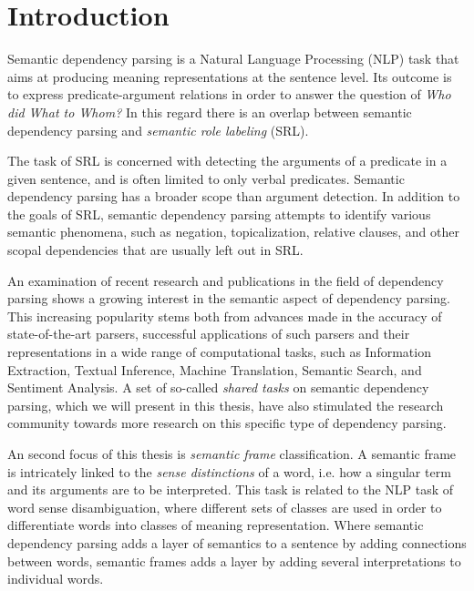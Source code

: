 \chapter{Introduction}
\label{chap:introduction}


Semantic dependency parsing is a Natural Language Processing (NLP) task that aims at producing meaning representations at the sentence level. Its outcome is to express predicate-argument relations in order to answer the question of \textit{Who did What to Whom?} In this regard there is an overlap between semantic dependency parsing and \textit{semantic role labeling} (SRL). 

The task of SRL is concerned with detecting the arguments of a predicate in a given sentence, and is often limited to only verbal predicates. Semantic dependency parsing has a broader scope than argument detection. In addition to the goals of SRL, semantic dependency parsing attempts to identify various semantic phenomena, such as negation, topicalization, relative clauses, and other scopal dependencies that are usually left out in SRL.

An examination of recent research and publications in the field of dependency parsing shows a growing interest in the semantic aspect of dependency parsing. This increasing popularity stems both from advances made in the accuracy of state-of-the-art parsers, successful applications of such parsers and their representations in a wide range of computational tasks, such as Information Extraction, Textual Inference, Machine Translation, Semantic Search, and Sentiment Analysis. A set of so-called \textit{shared tasks} on semantic dependency parsing, which we will present in this thesis, have also stimulated the research community towards more research on this specific type of dependency parsing.

An second focus of this thesis is \textit{semantic frame} classification. A semantic frame is intricately linked to the \textit{sense distinctions} of a word, i.e. how a singular term and its arguments are to be interpreted. This task is related to the NLP task of word sense disambiguation, where different sets of classes are used in order to differentiate words into classes of meaning representation. Where semantic dependency parsing adds a layer of semantics to a sentence by adding connections between words, semantic frames adds a layer by adding several interpretations to individual words.

